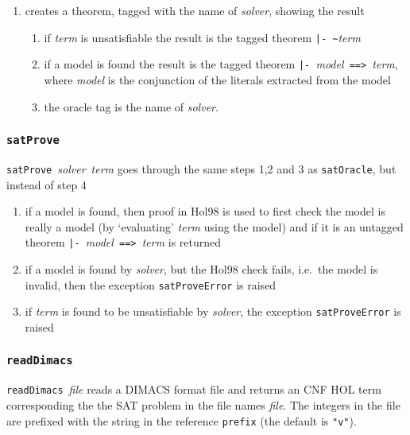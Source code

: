 \documentclass[12pt]{article}
\renewcommand{\t}[1]{\mbox{\small\tt #1}}
\newcommand\HOL{HOL\xspace}
\newcommand\Hol{Hol98\xspace}
\begin{document}
\begin{enumerate}
\item creates a theorem, tagged with the name of {\it solver}, showing the result

\begin{enumerate}

\item if {\it term} is unsatisfiable the result is the tagged theorem {\small\verb+|- ~+}{\it{term}}
\item if a model is found the result is the tagged theorem 
{\small\verb+|- +}{\it{model}}{\small\verb+ ==> +}{\it{term}},
where {\it model} is the conjunction of the literals extracted from the model
\item the oracle tag is the name of {\it solver}.
\end{enumerate}
\end{enumerate}

\subsubsection{\tt satProve}

{\small{\tt satProve}~{\it solver}~{\it term}} goes through the same steps 1,2 and 3 
as {\tt satOracle}, but instead of step 4

\begin{enumerate}
\item  if
a model is found, then proof in \Hol is used to first check the model
is really a model (by `evaluating' {\it term} using the model) and if it
is an untagged theorem {\small\verb+|- +}{\it{model}}{\small\verb+ ==> +}{\it{term}}
is returned

\item if a model is found by {\it solver}, but the \Hol check fails, 
i.e.~the model is invalid, then the exception \t{satProveError} is raised

\item if {\it term} is found to be unsatisfiable by {\it solver},
the exception \t{satProveError} is raised

\end{enumerate}

\subsubsection{\tt readDimacs}

{\small{\tt readDimacs}~{\it file}} reads a DIMACS format file and returns
an CNF \HOL term corresponding the the SAT problem in the file names {\it file}.
The integers in the file are prefixed with the string in the reference 
\t{prefix} (the default is {\small\verb+"v"+}).
\end{document}
